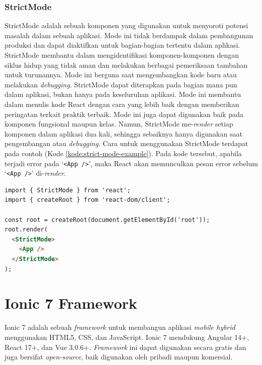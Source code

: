 \subsubsection{StrictMode}
StrictMode adalah sebuah komponen yang digunakan untuk menyoroti potensi masalah dalam sebuah aplikasi. Mode ini tidak berdampak dalam pembangunan produksi dan dapat diaktifkan untuk bagian-bagian tertentu dalam aplikasi. StrictMode membantu dalam mengidentifikasi komponen-komponen dengan siklus hidup yang tidak aman dan melakukan berbagai pemeriksaan tambahan untuk turunannya. Mode ini berguna saat mengembangkan kode baru atau melakukan \textit{debugging}. StrictMode dapat diterapkan pada bagian mana pun dalam aplikasi, bukan hanya pada keseluruhan aplikasi. Mode ini membantu dalam menulis kode React dengan cara yang lebih baik dengan memberikan peringatan terkait praktik terbaik. Mode ini juga dapat digunakan baik pada komponen fungsional maupun kelas. Namun, StrictMode me-\textit{render} setiap komponen dalam aplikasi dua kali, sehingga sebaiknya hanya digunakan saat pengembangan atau \textit{debugging}. Cara untuk menggunakan StrictMode terdapat pada contoh (Kode \ref{kode:strict-mode-example}). Pada kode tersebut, apabila terjadi error pada `\texttt{<App />}', maka React akan memunculkan pesan error sebelum `\texttt{<App />}' di-\textit{render}.

\begin{lstlisting}[language=HTML, caption=Contoh Potongan Kode StrictMode, label=kode:strict-mode-example]
import { StrictMode } from 'react';
import { createRoot } from 'react-dom/client';

const root = createRoot(document.getElementById('root'));
root.render(
  <StrictMode>
    <App />
  </StrictMode>
);
\end{lstlisting}

\section{\texorpdfstring{Ionic 7 Framework~\cite{ionic-docs}}{Ionic 7 Framework}}
\label{sec:template}
 
 

Ionic 7 adalah sebuah \textit{framework} untuk membangun aplikasi \textit{mobile hybrid} menggunakan HTML5, CSS, dan JavaScript. Ionic 7 mendukung Angular 14+, React 17+, dan Vue 3.0.6+. \textit{Framework} ini dapat digunakan secara gratis dan juga bersifat \textit{open-source}, baik digunakan oleh pribadi maupun komersial.

